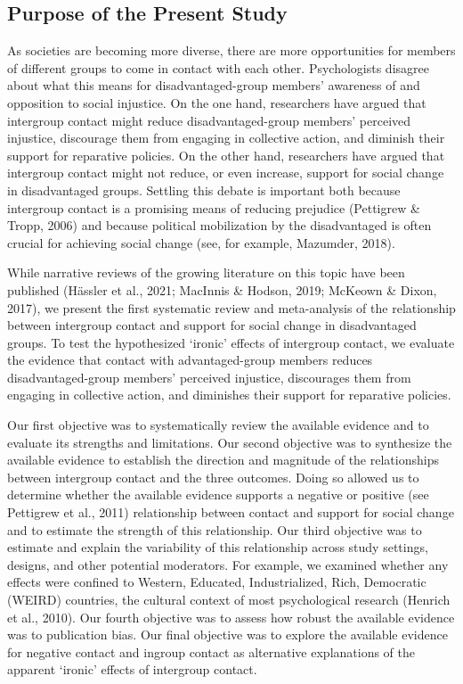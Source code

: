 \documentclass[12pt, letterpaper]{article}
\begin{document}
\hypertarget{purpose-of-the-present-study}{%
\subsection{Purpose of the Present
Study}\label{purpose-of-the-present-study}}

As societies are becoming more diverse, there are more opportunities for
members of different groups to come in contact with each other.
Psychologists disagree about what this means for disadvantaged-group
members' awareness of and opposition to social injustice. On the one
hand, researchers have argued that intergroup contact might reduce
disadvantaged-group members' perceived injustice, discourage them from
engaging in collective action, and diminish their support for reparative
policies. On the other hand, researchers have argued that intergroup
contact might not reduce, or even increase, support for social change in
disadvantaged groups. Settling this debate is important both because
intergroup contact is a promising means of reducing prejudice (Pettigrew
\& Tropp, 2006) and because political mobilization by the disadvantaged
is often crucial for achieving social change (see, for example,
Mazumder, 2018).

While narrative reviews of the growing literature on this topic have
been published (Hässler et al., 2021; MacInnis \& Hodson, 2019; McKeown
\& Dixon, 2017), we present the first systematic review and
meta-analysis of the relationship between intergroup contact and support
for social change in disadvantaged groups. To test the hypothesized
`ironic' effects of intergroup contact, we evaluate the evidence that
contact with advantaged-group members reduces disadvantaged-group
members' perceived injustice, discourages them from engaging in
collective action, and diminishes their support for reparative policies.

Our first objective was to systematically review the available evidence
and to evaluate its strengths and limitations. Our second objective was
to synthesize the available evidence to establish the direction and
magnitude of the relationships between intergroup contact and the three
outcomes. Doing so allowed us to determine whether the available
evidence supports a negative or positive (see Pettigrew et al., 2011)
relationship between contact and support for social change and to
estimate the strength of this relationship. Our third objective was to
estimate and explain the variability of this relationship across study
settings, designs, and other potential moderators. For example, we
examined whether any effects were confined to Western, Educated,
Industrialized, Rich, Democratic (WEIRD) countries, the cultural context
of most psychological research (Henrich et al., 2010). Our fourth
objective was to assess how robust the available evidence was to
publication bias. Our final objective was to explore the available
evidence for negative contact and ingroup contact as alternative
explanations of the apparent `ironic' effects of intergroup contact.
\end{document}
